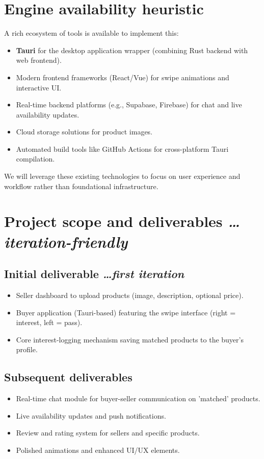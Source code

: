 \documentclass[11pt,a4paper]{article}
\newcommand{\BvrHint}[1]{%
  {\normalfont\normalsize\itshape\hfill #1}}
\begin{document}
\section{Engine availability heuristic}
A rich ecosystem of tools is available to implement this:
\begin{itemize}[leftmargin=0.7cm]
    \item \textbf{Tauri} for the desktop application wrapper (combining Rust backend with web frontend).
    \item Modern frontend frameworks (React/Vue) for swipe animations and interactive UI.
    \item Real-time backend platforms (e.g., Supabase, Firebase) for chat and live availability updates.
    \item Cloud storage solutions for product images.
    \item Automated build tools like GitHub Actions for cross-platform Tauri compilation.
\end{itemize}
We will leverage these existing technologies to focus on user experience and workflow rather than foundational infrastructure.

\section{Project scope and deliverables %
\BvrHint{\ldots iteration-friendly}}
\subsection{Initial deliverable %
\BvrHint{\ldots first iteration}}
\begin{itemize}[leftmargin=0.7cm]
    \item Seller dashboard to upload products (image, description, optional price).
    \item Buyer application (Tauri-based) featuring the swipe interface (right = interest, left = pass).
    \item Core interest-logging mechanism saving matched products to the buyer's profile.
\end{itemize}

\subsection{Subsequent deliverables}
\begin{itemize}[leftmargin=0.7cm]
    \item Real-time chat module for buyer-seller communication on 'matched' products.
    \item Live availability updates and push notifications.
    \item Review and rating system for sellers and specific products.
    \item Polished animations and enhanced UI/UX elements.
\end{itemize}
\end{document}
